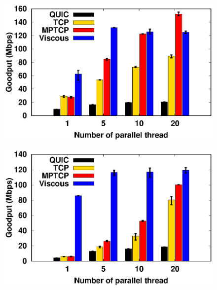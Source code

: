     \begin{figure}[!t]
        \begin{center}
            \begin{minipage}{0.45\linewidth}
                \centering
                \includegraphics[width=\linewidth]{img/exp10/goodput_1}
                \label{fig:exp10_goodput_16}
            \end{minipage}
            \begin{minipage}{0.45\linewidth}
                \centering
                \includegraphics[width=\linewidth]{img/exp10/goodput_5}
                \label{fig:exp10_goodput_80}
            \end{minipage}
            \begin{minipage}{0.45\linewidth}
                \centering

\end{minipage}
\end{center}
\end{figure}
